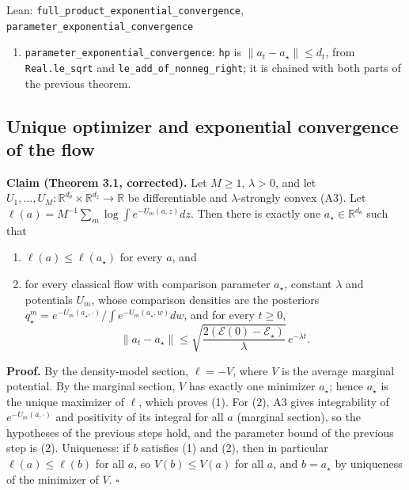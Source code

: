 \documentclass[11pt,a4paper]{report}
\begin{document}
\begin{leanbox}{Lean: \texttt{full\_\allowbreak{}product\_\allowbreak{}exponential\_\allowbreak{}convergence}, \texttt{parameter\_\allowbreak{}exponential\_\allowbreak{}convergence}}
\begin{enumerate}
\item \texttt{parameter\_\allowbreak{}exponential\_\allowbreak{}convergence}: \texttt{hp} is \(\|a_t-a_\star\|\le d_t\), from \texttt{Real.\allowbreak{}le\_\allowbreak{}sqrt} and \texttt{le\_\allowbreak{}add\_\allowbreak{}of\_\allowbreak{}nonneg\_\allowbreak{}right}; it is chained with both parts of the previous theorem.

\end{enumerate}
\end{leanbox}
\subsection{\texorpdfstring{Unique optimizer and exponential convergence of the flow}{Unique optimizer and exponential convergence of the flow}}


\textbf{Claim (Theorem 3.1, corrected).} Let \(M\ge1\), \(\lambda>0\), and let \(U_1,\dots,U_M:\mathbb R^{d_\theta}\times\mathbb R^{d_z}\to\mathbb R\) be differentiable and \(\lambda\)-strongly convex (A3). Let \(\ell(a)=M^{-1}\sum_m\log\int e^{-U_m(a,z)}dz\). Then there is exactly one \(a_\star\in\mathbb R^{d_\theta}\) such that



\begin{enumerate}


\item \(\ell(a)\le\ell(a_\star)\) for every \(a\), and

\item for every classical flow with comparison parameter \(a_\star\), constant \(\lambda\) and potentials \(U_m\), whose comparison densities are the posteriors \(q_\star^m=e^{-U_m(a_\star,\cdot)}/\int e^{-U_m(a_\star,w)}dw\), and for every \(t\ge0\),
\[\|a_t-a_\star\|\le\sqrt{\frac{2(\mathcal E(0)-\mathcal E_\star)}\lambda}\,e^{-\lambda t}.\]

\end{enumerate}



\textbf{Proof.} By the density-model section, \(\ell=-V\), where \(V\) is the average marginal potential. By the marginal section, \(V\) has exactly one minimizer \(a_\star\); hence \(a_\star\) is the unique maximizer of \(\ell\), which proves (1). For (2), A3 gives integrability of \(e^{-U_m(a,\cdot)}\) and positivity of its integral for all \(a\) (marginal section), so the hypotheses of the previous steps hold, and the parameter bound of the previous step is (2). Uniqueness: if \(b\) satisfies (1) and (2), then in particular \(\ell(a)\le\ell(b)\) for all \(a\), so \(V(b)\le V(a)\) for all \(a\), and \(b=a_\star\) by uniqueness of the minimizer of \(V\). \(\square\)
\end{document}
